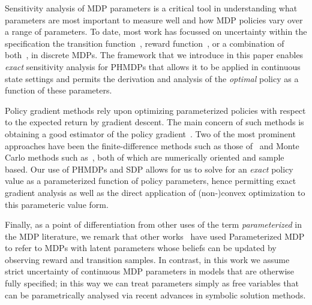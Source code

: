 Sensitivity analysis of MDP parameters is a critical tool in
understanding what parameters are most important to measure well and
how MDP policies vary over a range of parameters.  To date, most work
has focussed on uncertainty within the specification the transition
function~\parencite{Kalyanasundaram_AJC_2004}, reward
function~\parencite{Tan_JAP_2011, Hopp_JOTA_1988}, or a combination of
both~\parencite{Givan_AI_2000}, in discrete MDPs. The framework that
we introduce in this paper enables \textit{exact} sensitivity analysis
for PHMDPs that allows it to be applied in continuous state settings
and permits the derivation and analysis of the \emph{optimal} policy as a
function of these parameters.

Policy gradient methods rely upon optimizing parameterized policies
with respect to the expected return by gradient descent. The main
concern of such methods is obtaining a good estimator of the policy
gradient~\parencite{Peters_IRS_2006}. Two of the most prominent
approaches have been the finite-difference methods such as those
of~\parencite{Ng_UAI_2000} and Monte Carlo methods such
as~\parencite{Sutton_NIPS_1999,Baxter_ISCAS_2000}, both of which are numerically
oriented and sample based. Our use of PHMDPs and SDP allows for us to
solve for an \emph{exact} policy value as a parameterized function of
policy parameters, hence permitting exact gradient analysis as well as
the direct application of (non-)convex optimization to this parameteric
value form.

Finally, as a point of differentiation from other uses of the term
\emph{parameterized} in the MDP literature, we remark that other
works~\parencite{duff_phd_thesis_Bayesian_RL,Dearden_UAI_1999,gopalan_mannor} have
used Parameterized MDP to refer to MDPs with latent parameters whose
beliefs can be updated by observing reward and transition samples.  In
contrast, in this work we assume strict uncertainty of continuous MDP
parameters in models that are otherwise fully specified; in this way
we can treat parameters simply as free variables that can be
parametrically analysed via recent advances in symbolic solution
methods.


